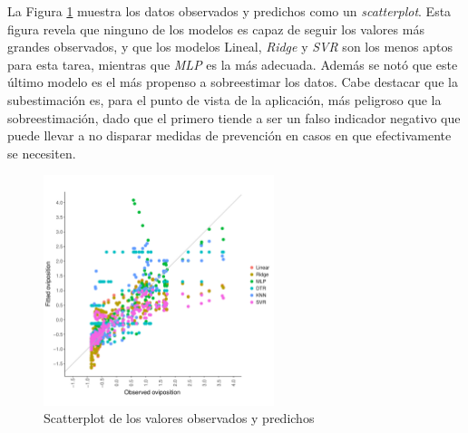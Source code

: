     \par La Figura \ref{fig:scatter} muestra los datos observados y predichos
      como un \textit{scatterplot}. Esta figura revela que ninguno de los modelos
      es capaz de seguir los valores más grandes observados, y que los modelos
      Lineal, \textit{Ridge} y \textit{SVR} son los menos aptos para esta
      tarea, mientras que \textit{MLP} es la más adecuada. Además se notó que
      este último modelo es el más propenso a sobreestimar los datos. Cabe
      destacar que la subestimación es, para el punto de vista de la aplicación,
      más peligroso que la sobreestimación, dado que el primero tiende a
      ser un falso indicador negativo que puede llevar a no disparar medidas
      de prevención en casos en que efectivamente se necesiten.
      \begin{figure}[hbt]
      \centering%
      \includegraphics[width=0.6\textwidth]{images/scatterplot}%
      \caption{Scatterplot de los valores observados y predichos}\label{fig:scatter}
      \end{figure}




